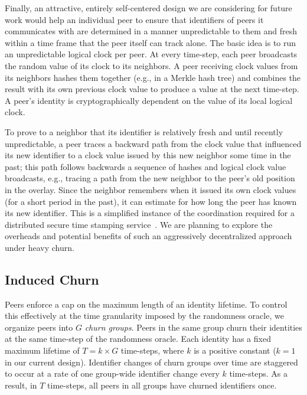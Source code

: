 \documentclass[11pt,twocolumn]{MyTightStyle}
\begin{document}
Finally, an attractive, entirely self-centered design we are considering
for future work would help an individual peer to ensure that identifiers
of peers it communicates with are determined in a manner unpredictable
to them and fresh within a time frame that the peer itself can track
alone.  The basic idea is to run an unpredictable logical clock per
peer.  At every time-step, each peer broadcasts the random value of its
clock to its neighbors.  A peer receiving clock values from its
neighbors hashes them together (e.g., in a Merkle hash tree) and
combines the result with its own previous clock value to produce a value
at the next time-step.  A peer's identity is cryptographically dependent
on the value of its local logical clock.

To prove to a neighbor that its identifier is relatively fresh and until
recently unpredictable, a peer traces a backward path from the clock
value that influenced its new identifier to a clock value issued by this
new neighbor some time in the past; this path follows backwards a
sequence of hashes and logical clock value broadcasts, e.g., tracing a
path from the new neighbor to the peer's old position in the overlay.
Since the neighbor remembers when it issued its own clock values (for a
short period in the past), it can estimate for how long the peer has
known its new identifier.  This is a simplified instance of the
coordination required for a distributed secure time stamping
service~\cite{Maniatis2002bshort}.  We are planning to explore the
overheads and potential benefits of such an aggressively decentralized
approach under heavy churn.


\subsection{Induced Churn}
\label{sec:churn}

Peers enforce a cap on the maximum length of an identity lifetime.
To control this effectively at the time granularity imposed by the
randomness oracle, we organize peers into $G$ \emph{churn groups}.  Peers in the same
group churn their identities at the same time-step of the randomness oracle.
Each identity has a fixed maximum lifetime of $T = k \times G$
time-steps, where $k$ is a positive constant ($k = 1$ in our
current design).   
Identifier changes of churn groups over time are staggered to occur at a rate
of one group-wide identifier change every $k$ time-steps.  As a result, in
$T$ time-steps, all peers in all groups have churned identifiers once.
\end{document}
